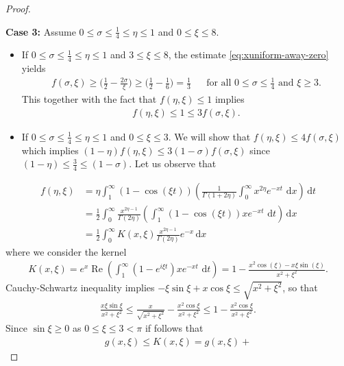 \documentclass[12pt, reqno]{amsart}%
\theoremstyle{plain}  %
\theoremstyle{definition}  %
\theoremstyle{remark}
\numberwithin{equation}{section}
\renewcommand{\d}{\,\mathrm{d}}
\begin{document}
\begin{proof}
\begin{itemize}
\end{itemize}
\textbf{Case 3: } Assume $0\leq \sigma\leq \frac{1}{4}\leq \eta\leq 1$ and $0\leq \xi\leq 8$.
\begin{itemize}
\item
If $0\leq \sigma\leq \frac{1}{4}\leq \eta\leq 1$ and $3\leq \xi\leq 8$, the estimate \eqref{eq:xuniform-away-zero} yields
\begin{align}\label{eq:sigma-less-quart-lob-bis}
f(\sigma,\xi)\geq\big( \frac{1}{2}-\frac{2\sigma}{\xi}\big)\geq \big( \frac{1}{2}-\frac{1}{6}\big)=\frac{1}{3}&& \text{for all $0\leq \sigma\leq \frac{1}{4}$ and $\xi\geq 3$}.
\end{align}
This together with the fact that $ f(\eta,\xi) \leq 1$
implies
\begin{align*}
f(\eta,\xi) \leq 1\leq 3f(\sigma,\xi).
\end{align*}
\item
If $0\leq \sigma\leq \frac{1}{4}\leq \eta\leq 1$ and $0\leq \xi\leq 3$. We will show that $f(\eta,\xi)\leq 4f(\sigma,\xi)$ which implies
$(1-\eta)f(\eta,\xi)\leq 3(1-\sigma)f(\sigma,\xi)$ since $(1-\eta)\leq \frac{3}{4}\leq (1-\sigma)$. Let us observe that
\end{itemize}
\begin{align*}
f(\eta, \xi)
&= \eta \int_{1}^{\infty}  (1-\cos(\xi t))
\left( \frac{1}{\Gamma(1+2\eta)} \int_{0}^{\infty} x^{2\eta} e^{-xt} \, \d x \right)  \d t \\
&=  \frac{1}{2} \int_{0}^{\infty} \frac{x^{2\eta-1} }{\Gamma(2\eta)}  \left( \int_{1}^{\infty} (1-\cos(\xi t)) xe^{-xt} \, \d t \right)  \d x \\
&=  \frac{1}{2} \int_{0}^{\infty} K(x,\xi) \frac{x^{2\eta-1}}{\Gamma(2\eta)} e^{-x} \d x
\end{align*}
where we consider the kernel
\begin{align*}
K(x,\xi)=e^x \operatorname{Re}\left( \int_{1}^{\infty} (1-e^{i\xi t})  xe^{-xt} \, \d t \right) =
1- \frac{x^2\cos (\xi) -x\xi  \sin(\xi)}{x^2+\xi^2 }.
\end{align*}
\noindent Cauchy-Schwartz inequality implies $-\xi\sin\xi + x\cos\xi
\leq \sqrt{x^2+\xi^2}$, so that
\begin{align*}
\frac{x\xi\sin\xi}{x^2+\xi^2}
\leq
\frac{x}{\sqrt{x^2+\xi^2}}- \frac{x^2\cos\xi}{x^2+\xi^2}
\leq 1-\frac{x^2\cos\xi}{x^2+\xi^2}.
\end{align*}
Since $\sin\xi\geq 0$ as  $0\leq \xi\leq 3<\pi$ if follows that
\begin{align*}
 g(x, \xi) \leq K(x,\xi)= g(x,\xi) +

\end{align*}
\end{proof}
\end{document}
